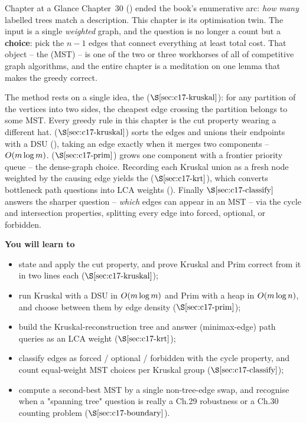 \begin{chaptertheorybox}{Chapter at a Glance}
Chapter~30 () ended the book's enumerative arc: \emph{how many}
labelled trees match a description.  This chapter is its optimisation twin.
The input is a single \emph{weighted} graph, and the question is no longer a
count but a \textbf{choice}: pick the \(n-1\) edges that connect everything at
least total cost.  That object -- the  (MST) -- is
one of the two or three workhorses of all of competitive graph algorithms, and
the entire chapter is a meditation on one lemma that makes the greedy correct.

The method rests on a single idea, the 
(\(\secref{c17-kruskal}\)): for any partition of the vertices into two sides,
the cheapest edge crossing the partition belongs to some MST.  Every greedy
rule in this chapter is the cut property wearing a different hat.  
(\(\secref{c17-kruskal}\)) sorts the edges and unions their endpoints with a DSU
(), taking an edge exactly when it merges two components -- \(O(m
\log m)\).   (\(\secref{c17-prim}\)) grows one component with a
frontier priority queue -- the dense-graph choice.  Recording each Kruskal union
as a fresh node weighted by the causing edge yields the
 (\(\secref{c17-krt}\)), which converts
bottleneck path questions into LCA weights ().  Finally
\(\secref{c17-classify}\) answers the sharper question -- \emph{which} edges can
appear in an MST -- via the cycle and intersection properties, splitting every
edge into forced, optional, or forbidden.

\textbf{You will learn to}
\begin{itemize}[nosep]
  \item state and apply the cut property, and prove Kruskal and Prim correct
        from it in two lines each (\(\secref{c17-kruskal}\)); \hfill{}
  \item run Kruskal with a DSU in \(O(m\log m)\) and Prim with a heap in
        \(O(m\log n)\), and choose between them by edge density
        (\(\secref{c17-prim}\)); \hfill{}
  \item build the Kruskal-reconstruction tree and answer 
        (minimax-edge) path queries as an LCA weight (\(\secref{c17-krt}\));
        \hfill{}
  \item classify edges as forced / optional / forbidden with the cycle property,
        and count equal-weight MST choices per Kruskal group
        (\(\secref{c17-classify}\)); \hfill{}
  \item compute a second-best MST by a single non-tree-edge swap, and recognise
        when a "spanning tree" question is really a Ch.29 robustness or a Ch.30
        counting problem (\(\secref{c17-boundary}\)). \hfill{}
\end{itemize}


\end{chaptertheorybox}
